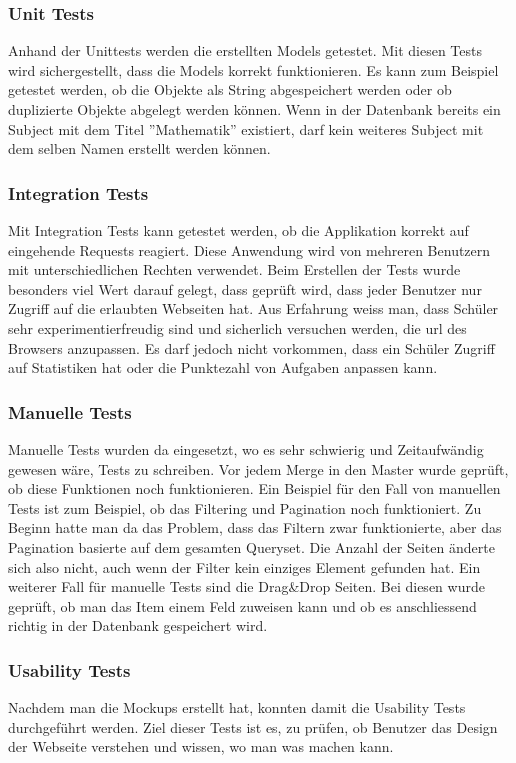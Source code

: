 \subsubsection{Unit Tests}
Anhand der Unittests werden die erstellten Models getestet. Mit diesen Tests wird sichergestellt, dass die Models korrekt funktionieren. Es kann zum Beispiel getestet werden, ob die Objekte als String abgespeichert werden oder ob duplizierte Objekte abgelegt werden können. Wenn in der Datenbank bereits ein Subject mit dem Titel ''Mathematik'' existiert, darf kein weiteres Subject mit dem selben Namen erstellt werden können.


\subsubsection{Integration Tests}
Mit Integration Tests kann getestet werden, ob die Applikation korrekt auf eingehende Requests reagiert. Diese Anwendung wird von mehreren Benutzern mit unterschiedlichen Rechten verwendet. Beim Erstellen der Tests wurde besonders viel Wert darauf gelegt, dass geprüft wird, dass jeder Benutzer nur Zugriff auf die erlaubten Webseiten hat. Aus Erfahrung weiss man, dass Schüler sehr experimentierfreudig sind und sicherlich versuchen werden, die \gls{url} des Browsers anzupassen. Es darf jedoch nicht vorkommen, dass ein Schüler Zugriff auf Statistiken hat oder die Punktezahl von Aufgaben anpassen kann.


\subsubsection{Manuelle Tests}
Manuelle Tests wurden da eingesetzt, wo es sehr schwierig und Zeitaufwändig gewesen wäre, Tests zu schreiben. Vor jedem Merge in den Master wurde geprüft, ob diese Funktionen noch funktionieren. Ein Beispiel für den Fall von manuellen Tests ist zum Beispiel, ob das Filtering und Pagination noch funktioniert. Zu Beginn hatte man da das Problem, dass das Filtern zwar funktionierte, aber das Pagination basierte auf dem gesamten Queryset. Die Anzahl der Seiten änderte sich also nicht, auch wenn der Filter kein einziges Element gefunden hat. Ein weiterer Fall für manuelle Tests sind die Drag\&Drop Seiten. Bei diesen wurde geprüft, ob man das Item einem Feld zuweisen kann und ob es anschliessend richtig in der Datenbank gespeichert wird. \\


\subsubsection{Usability Tests}
Nachdem man die Mockups erstellt hat, konnten damit die Usability Tests durchgeführt werden. Ziel dieser Tests ist es, zu prüfen, ob Benutzer das Design der Webseite verstehen und wissen, wo man was machen kann. \\

